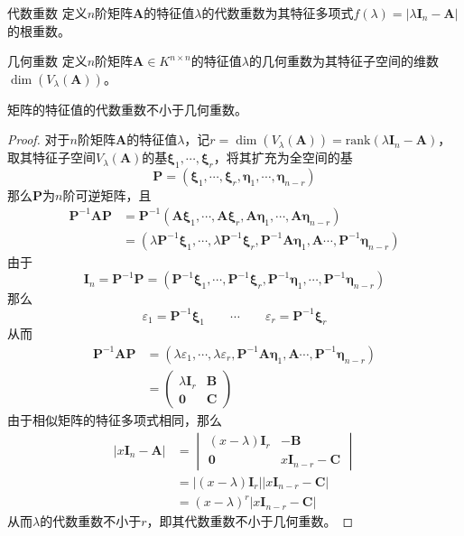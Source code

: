\documentclass[lang = cn, scheme = chinese, thmcnt = section]{elegantbook}
\newcommand{\bs}{\boldsymbol}          %
\newcommand{\rank}{\text{rank}}        %
\begin{document}
\begin{definition}{代数重数}
	定义$n$阶矩阵$\bs{A}$的特征值$\lambda$的代数重数为其特征多项式$f(\lambda)=|\lambda\bs{I}_n-\bs{A}|$的根重数。
\end{definition}

\begin{definition}{几何重数}
	定义$n$阶矩阵$\bs{A}\in K^{n\times n}$的特征值$\lambda$的几何重数为其特征子空间的维数$\dim(V_\lambda(\bs{A}))$。
\end{definition}

\begin{theorem}
	矩阵的特征值的代数重数不小于几何重数。
\end{theorem}

\begin{proof}
	对于$n$阶矩阵$\bs{A}$的特征值$\lambda$，记$r=\dim(V_\lambda(\bs{A}))=\rank(\lambda \bs{I}_n-\bs{A})$，取其特征子空间$V_\lambda(\bs{A})$的基$\bs{\xi}_1,\cdots,\bs{\xi}_r$，将其扩充为全空间的基
	$$
	\bs{P}=(\bs{\xi}_1,\cdots,\bs{\xi}_r,\bs{\eta}_1,\cdots, \bs{\eta}_{n-r} )
	$$
	那么$\bs{P}$为$n$阶可逆矩阵，且
	\begin{align*}
		\bs{P}^{-1}\bs{AP}
		& = \bs{P}^{-1}(\bs{A}\bs{\xi}_1,\cdots,\bs{A}\bs{\xi}_r,\bs{A}\bs{\eta}_1,\cdots, \bs{A}\bs{\eta}_{n-r} )\\
		& = (\lambda\bs{P}^{-1}\bs{\xi}_1,\cdots, \lambda\bs{P}^{-1}\bs{\xi}_r, \bs{P}^{-1}\bs{A}\bs{\eta}_1,\bs{A}\cdots, \bs{P}^{-1}\bs{\eta}_{n-r} )
	\end{align*}
	由于
	$$
	\bs{I}_n=\bs{P}^{-1}\bs{P}
	=(\bs{P}^{-1}\bs{\xi}_1,\cdots,\bs{P}^{-1}\bs{\xi}_r,\bs{P}^{-1}\bs{\eta}_1,\cdots, \bs{P}^{-1}\bs{\eta}_{n-r} )
	$$
	那么
	$$
	\varepsilon_1=\bs{P}^{-1}\bs{\xi}_1\qquad
	\cdots\qquad 
	\varepsilon_r=\bs{P}^{-1}\bs{\xi}_r
	$$
	从而
	\begin{align*}
		\bs{P}^{-1}\bs{AP}
		& = (\lambda \varepsilon_1,\cdots, \lambda \varepsilon_r, \bs{P}^{-1}\bs{A}\bs{\eta}_1,\bs{A}\cdots, \bs{P}^{-1}\bs{\eta}_{n-r} )\\
		& = \begin{pmatrix}
			\lambda \bs{I}_r & \bs{B}\\
			\bs{0} & \bs{C}
		\end{pmatrix}
	\end{align*}
	由于相似矩阵的特征多项式相同，那么
	\begin{align*}
		|x\bs{I}_n-\bs{A}|
		& = \begin{vmatrix}
			(x-\lambda)\bs{I}_r & -\bs{B}\\
			\bs{0} & x\bs{I}_{n-r}-\bs{C}
		\end{vmatrix}\\
		& = |(x-\lambda)\bs{I}_r||x\bs{I}_{n-r}-\bs{C}|\\
		& = (x-\lambda)^r|x\bs{I}_{n-r}-\bs{C}|
	\end{align*}
	从而$\lambda$的代数重数不小于$r$，即其代数重数不小于几何重数。
\end{proof}
\end{document}

